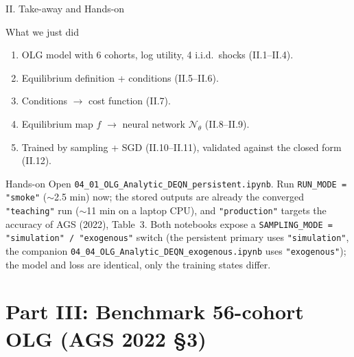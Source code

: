 \documentclass[aspectratio=169,11pt]{beamer}
\newcommand{\emphc}[1]{\textcolor{harvardcrimson}{#1}}
\newcommand{\N}{\mathcal{N}}
\begin{document}
\begin{frame}{II. Take-away and Hands-on}
\footnotesize
\begin{block}{What we just did}
\begin{enumerate}\itemsep1pt
    \item OLG model with 6 cohorts, log utility, 4 i.i.d.\ shocks (II.1--II.4).
    \item Equilibrium definition + conditions (II.5--II.6).
    \item Conditions $\to$ \emphc{cost function} (II.7).
    \item Equilibrium map $f$ $\to$ neural network $\N_\theta$ (II.8--II.9).
    \item Trained by sampling + SGD (II.10--II.11), \emphc{validated} against the closed form (II.12).
\end{enumerate}
\end{block}

\begin{block}{Hands-on}
Open \texttt{04\_01\_OLG\_Analytic\_DEQN\_persistent.ipynb}.  Run \texttt{RUN\_MODE = "smoke"} ($\sim$2.5 min) now; the stored outputs are already the converged \texttt{"teaching"} run ($\sim$11 min on a laptop CPU), and \texttt{"production"} targets the accuracy of AGS (2022), Table~3.  Both notebooks expose a \texttt{SAMPLING\_MODE = "simulation" / "exogenous"} switch (the persistent primary uses \texttt{"simulation"}, the companion \texttt{04\_04\_OLG\_Analytic\_DEQN\_exogenous.ipynb} uses \texttt{"exogenous"}); the model and loss are identical, only the training states differ.
\end{block}
\end{frame}



\section{Part III: Benchmark 56-cohort OLG (AGS 2022 \S 3)}
\end{document}
